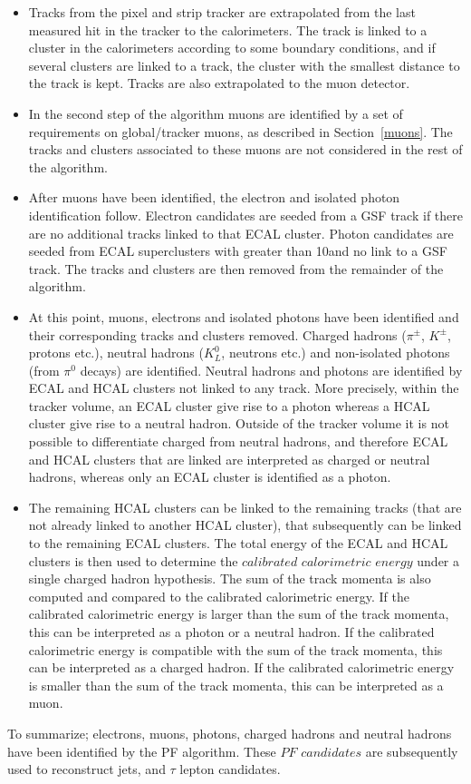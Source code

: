 \begin{itemize}
\item Tracks from the pixel and strip tracker are extrapolated from the last measured hit in the tracker to the calorimeters. 
The track is linked to a cluster in the calorimeters according to some boundary conditions, and if several clusters are linked to a track, the cluster with the smallest distance to the track is kept. 
Tracks are also extrapolated to the muon detector. 
\item In the second step of the algorithm muons are identified by a set of requirements on global/tracker muons, as described in Section~\ref{muons}. 
The tracks and clusters associated to these muons are not considered in the rest of the algorithm. 
\item After muons have been identified, the electron and isolated photon identification follow. 
Electron candidates are seeded from a GSF track if there are no additional tracks linked to that ECAL cluster. 
Photon candidates are seeded from ECAL superclusters with \ET greater than 10\GeV and no link to a GSF track.
The tracks and clusters are then removed from the remainder of the algorithm. 
\item At this point, muons, electrons and isolated photons have been identified and their corresponding tracks and clusters removed. 
Charged hadrons ($\pi^{\pm}$, $K^{\pm}$, protons etc.), neutral hadrons ($K_{L}^{0}$, neutrons etc.) and non-isolated photons (from $\pi^{0}$ decays) are identified. 
Neutral hadrons and photons are identified by ECAL and HCAL clusters not linked to any track. 
More precisely, within the tracker volume, an ECAL cluster give rise to a photon whereas a HCAL cluster give rise to a neutral hadron. 
Outside of the tracker volume it is not possible to differentiate charged from neutral hadrons, and therefore ECAL and HCAL clusters that are linked are interpreted as charged or neutral hadrons, whereas only an ECAL cluster is identified as a photon. 
\item The remaining HCAL clusters can be linked to the remaining tracks (that are not already linked to another HCAL cluster), that subsequently can be linked to the remaining ECAL clusters. 
The total energy of the ECAL and HCAL clusters is then used to determine the $calibrated$ $calorimetric$ $energy$ under a single charged hadron hypothesis. 
The sum of the track momenta is also computed and compared to the calibrated calorimetric energy. 
If the calibrated calorimetric energy is larger than the sum of the track momenta, this can be interpreted as a photon or a neutral hadron. 
If the calibrated calorimetric energy is compatible with the sum of the track momenta, this can be interpreted as a charged hadron. 
If the calibrated calorimetric energy is smaller than the sum of the track momenta, this can be interpreted as a muon. 
\end{itemize}
To summarize; electrons, muons, photons, charged hadrons and neutral hadrons have been identified by the PF algorithm. 
These $PF$ $candidates$ are subsequently used to reconstruct jets, \ptmiss and $\tau$ lepton candidates.   
